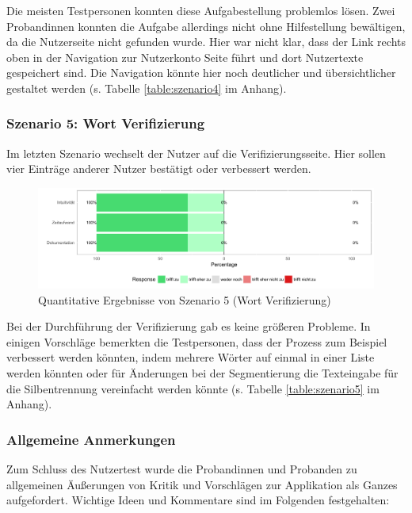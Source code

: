 Die meisten Testpersonen konnten diese Aufgabestellung problemlos lösen. Zwei Probandinnen konnten die Aufgabe allerdings nicht ohne Hilfestellung bewältigen, da die Nutzerseite nicht gefunden wurde. Hier war nicht klar, dass der Link rechts oben in der Navigation zur Nutzerkonto Seite führt und dort Nutzertexte gespeichert sind. Die Navigation könnte hier noch deutlicher und übersichtlicher gestaltet werden (s. Tabelle \ref{table:szenario4} im Anhang).

\subsubsection{Szenario 5: Wort Verifizierung}

Im letzten Szenario wechselt der Nutzer auf die Verifizierungsseite. Hier sollen vier Einträge anderer Nutzer bestätigt oder verbessert werden.

\begin{figure}[h!]
	\centering
	\includegraphics[width=.8\linewidth]{figures/evaluation/scenario5}
	\caption{Quantitative Ergebnisse von Szenario 5 (Wort Verifizierung)}
	\label{fig:evaluation-sc5}
\end{figure}

Bei der Durchführung der Verifizierung gab es keine größeren Probleme. In einigen Vorschläge bemerkten die Testpersonen, dass der Prozess zum Beispiel verbessert werden könnten, indem mehrere Wörter auf einmal in einer Liste  werden könnten oder für Änderungen bei der Segmentierung die Texteingabe für die Silbentrennung vereinfacht werden könnte (s. Tabelle \ref{table:szenario5} im Anhang).

\subsubsection{Allgemeine Anmerkungen}

Zum Schluss des Nutzertest wurde die Probandinnen und Probanden zu allgemeinen Äußerungen von Kritik und Vorschlägen zur Applikation als Ganzes aufgefordert. Wichtige Ideen und Kommentare sind im Folgenden festgehalten:

